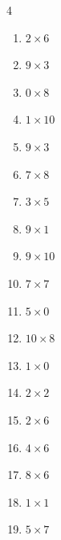 


\setcounter{quesnum}{120}

\begin{multicols}{4}
\begin{enumerate}
  \itemsep=5pt
  \item $2\times 6$
        \phantom{$=12$}

  \item $9\times 3$
        \phantom{$=27$}

  \item $0\times 8$
        \phantom{$=0$}

  \item $1\times 10$
        \phantom{$=10$}

  \item $9\times 3$
        \phantom{$=27$}

  \item $7\times 8$
        \phantom{$=56$}

  \item $3\times 5$
        \phantom{$=15$}

  \item $9\times 1$
        \phantom{$=9$}

  \item $9\times 10$
        \phantom{$=90$}

  \item $7\times 7$
        \phantom{$=49$}

  \item $5\times 0$
        \phantom{$=0$}

  \item $10\times 8$
        \phantom{$=80$}

  \item $1\times 0$
        \phantom{$=0$}

  \item $2\times 2$
        \phantom{$=4$}

  \item $2\times 6$
        \phantom{$=12$}

  \item $4\times 6$
        \phantom{$=24$}

  \item $8\times 6$
        \phantom{$=48$}

  \item $1\times 1$
        \phantom{$=1$}

  \item $5\times 7$
        \phantom{$=35$}


\end{enumerate}
\end{multicols}
